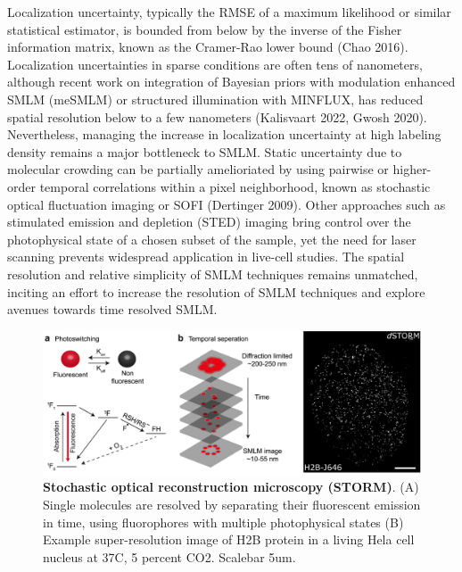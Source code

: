 \documentclass{ucetd}
\begin{document}
Localization uncertainty, typically the RMSE of a maximum likelihood or similar statistical estimator, is bounded from below by the inverse of the Fisher information matrix, known as the Cramer-Rao lower bound (Chao 2016). Localization uncertainties in sparse conditions are often tens of nanometers, although recent work on integration of Bayesian priors with modulation enhanced SMLM (meSMLM) or structured illumination with MINFLUX, has reduced spatial resolution below to a few nanometers (Kalisvaart 2022, Gwosh 2020). Nevertheless, managing the increase in localization uncertainty at high labeling density remains a major bottleneck to SMLM. Static uncertainty due to molecular crowding can be partially amelioriated by using pairwise or higher-order temporal correlations within a pixel neighborhood, known as stochastic optical fluctuation imaging or SOFI (Dertinger 2009). Other approaches such as stimulated emission and depletion (STED) imaging bring control over the photophysical state of a chosen subset of the sample, yet the need for laser scanning prevents widespread application in live-cell studies. The spatial resolution and relative simplicity of SMLM techniques remains unmatched, inciting an effort to increase the resolution of SMLM techniques and explore avenues towards time resolved SMLM.

\begin{figure}
\includegraphics[width=\textwidth]{Intro.png}
\caption{\textbf{Stochastic optical reconstruction microscopy (STORM)}. (A) Single molecules are resolved by separating their fluorescent emission in time, using fluorophores with multiple photophysical states (B) Example super-resolution image of H2B protein in a living Hela cell nucleus at 37C, 5 percent CO2. Scalebar 5um.}
\end{figure}
\end{document}
